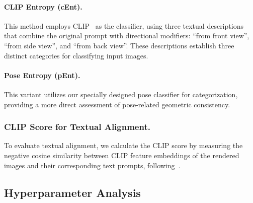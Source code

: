 \paragraph{CLIP Entropy (cEnt).} This method employs CLIP~\citep{radford2021learning} as the classifier, using three textual descriptions that combine the original prompt with directional modifiers: ``from front view'', ``from side view'', and ``from back view''. These descriptions establish three distinct categories for classifying input images.

\paragraph{Pose Entropy (pEnt).} This variant utilizes our specially designed pose classifier for categorization, providing a more direct assessment of pose-related geometric consistency.

\subsubsection{CLIP Score for Textual Alignment.}
To evaluate textual alignment, we calculate the CLIP score by measuring the negative cosine similarity between CLIP feature embeddings of the rendered images and their corresponding text prompts, following~\citet{wang2024taming}.




\subsection{Hyperparameter Analysis}\label{app:main_exps_hyper}





